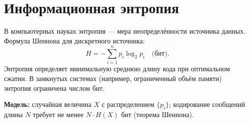 \documentclass[areasetadvanced]{scrartcl}
\begin{document}
        \section{Информационная энтропия}
                В компьютерных науках энтропия — мера неопределённости источника данных. 
                Формула Шеннона для дискретного источника:
                \[
                H = -\sum_{i=1}^{n} p_i \log_2 p_i \quad \text{(бит)}.
                \]
                Энтропия определяет минимальную среднюю длину кода при оптимальном сжатии. 
                В замкнутых системах (например, ограниченный объём памяти) энтропия ограничена числом бит.
                        
                \textbf{Модель:} случайная величина $X$ с распределением $\{p_i\}$; 
                кодирование сообщений длины $N$ требует не менее $N \cdot H(X)$ бит (теорема Шеннона).
                        
\end{document}
